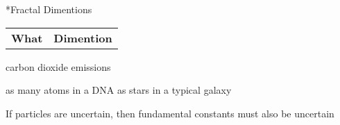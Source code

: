 \documentclass[8pt,a4paper]{extarticle}
\begin{document}
\pagebreak
\begin{section}
*{Fractal Dimentions}

\begin{tabular}{l l}
\bf{What} & \bf{Dimention}\\

\end{tabular}
\end{section}
carbon dioxide emissions

as many atoms in a DNA as stars in a typical galaxy

{If particles are uncertain, then fundamental constants must also be uncertain}

\pagebreak
{}
\end{document}
